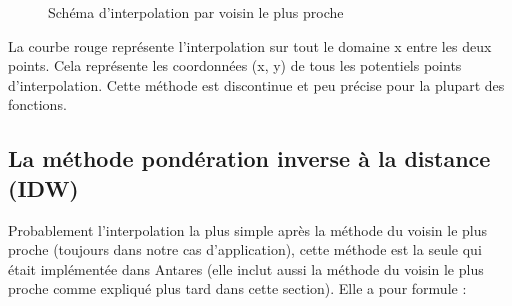 \begin{figure}[H]
    \centering
    \caption{Schéma d'interpolation par voisin le plus proche}
    \label{fig:interpolation_voisin}
\end{figure}

La courbe rouge représente l'interpolation sur tout le domaine x entre les deux points. Cela représente les coordonnées (x, y) de tous les potentiels points d'interpolation.
Cette méthode est discontinue et peu précise pour la plupart des fonctions.



\subsection{La méthode pondération inverse à la distance (IDW)} %

Probablement l'interpolation la plus simple après la méthode du voisin le plus proche (toujours dans notre cas d'application), cette méthode est la seule qui était implémentée dans Antares (elle inclut aussi la méthode du voisin le plus proche comme expliqué plus tard dans cette section). Elle a pour formule :

